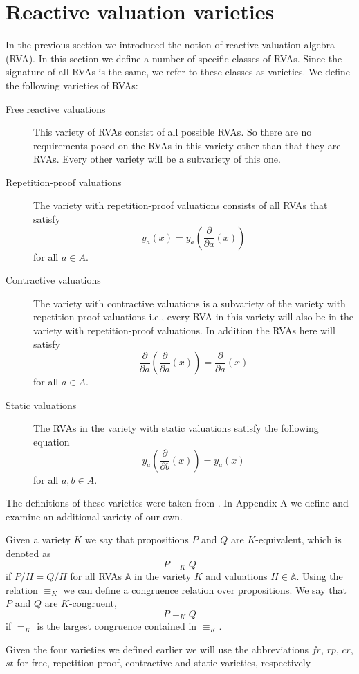 \documentclass[a4paper,twoside,openright]{report}
\newcommand{\dd}[1]{\frac{\partial}{\partial #1}}
\begin{document}
\section{Reactive valuation varieties}
In the previous section we introduced the notion of reactive valuation algebra (RVA). In this section we define a number of specific classes of RVAs. Since the signature of all RVAs is the same, we refer to these classes as varieties. We define the following varieties of RVAs:
\begin{description}
\item[Free reactive valuations] This variety of RVAs consist of all possible RVAs. So there are no requirements posed on the RVAs in this variety other than that they are RVAs. Every other variety will be a subvariety of this one.
\item[Repetition-proof valuations] The variety with repetition-proof valuations consists of all RVAs that satisfy
\[
y_a(x) = y_a(\dd a(x))
\]
for all $a\in A$.
\item[Contractive valuations] The variety with contractive valuations is a subvariety of the variety with repetition-proof valuations i.e., every RVA in this variety will also be in the variety with repetition-proof valuations. In addition the RVAs here will satisfy
\[
\dd a(\dd a(x)) = \dd a(x)
\]
for all $a\in A$.
\item[Static valuations] The RVAs in the variety with static valuations satisfy the following equation
\[
y_a(\dd b(x))=y_a(x)
\]
for all $a,b\in A$.
\end{description}
The definitions of these varieties were taken from \cite{main}. In Appendix A we define and examine an additional variety of our own.

Given a variety $K$ we say that propositions $P$ and $Q$ are $K$-equivalent, which is denoted as
\[
P\equiv_K Q
\]
if $P/H=Q/H$ for all RVAs $\mathbb{A}$ in the variety $K$ and valuations $H\in\mathbb{A}$. Using the relation $\equiv_K$ we can define a congruence relation over propositions. We say that $P$ and $Q$ are $K$-congruent,
\[
P=_K Q
\]
if $=_K$ is the largest congruence contained in $\equiv_K$.

Given the four varieties we defined earlier we will use the abbreviations $fr$, $rp$, $cr$, $st$ for free, repetition-proof, contractive and static varieties, respectively
\end{document}
